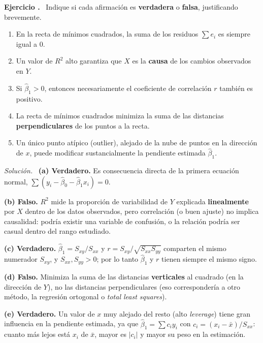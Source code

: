 \documentclass[11pt,a4paper]{article}
\newcounter{ejnum}
\newenvironment{ejercicio}{\refstepcounter{ejnum}\par\medskip\noindent\textbf{Ejercicio \theejnum.}~}{\par}
\newenvironment{solucion}{\par\noindent\textit{Solución.}~}{\par\vspace{1em}}
\begin{document}
\begin{ejercicio}
Indique si cada afirmación es \textbf{verdadera} o \textbf{falsa}, justificando brevemente.
\begin{enumerate}[label=(\alph*)]
\item En la recta de mínimos cuadrados, la suma de los residuos $\sum e_i$ es siempre igual a $0$.
\item Un valor de $R^2$ alto garantiza que $X$ es la \textbf{causa} de los cambios observados en $Y$.
\item Si $\hat\beta_1>0$, entonces necesariamente el coeficiente de correlación $r$ también es positivo.
\item La recta de mínimos cuadrados minimiza la suma de las distancias \textbf{perpendiculares} de los puntos a la recta.
\item Un único punto atípico (outlier), alejado de la nube de puntos en la dirección de $x$, puede modificar sustancialmente la pendiente estimada $\hat\beta_1$.
\end{enumerate}
\end{ejercicio}

\begin{solucion}
\textbf{(a) Verdadero.} Es consecuencia directa de la primera ecuación normal, $\sum(y_i-\hat\beta_0-\hat\beta_1x_i)=0$.

\textbf{(b) Falso.} $R^2$ mide la proporción de variabilidad de $Y$ explicada \textbf{linealmente} por $X$ dentro de los datos observados, pero correlación (o buen ajuste) no implica causalidad: podría existir una variable de confusión, o la relación podría ser casual dentro del rango estudiado.

\textbf{(c) Verdadero.} $\hat\beta_1=S_{xy}/S_{xx}$ y $r=S_{xy}/\sqrt{S_{xx}S_{yy}}$ comparten el mismo numerador $S_{xy}$, y $S_{xx},S_{yy}>0$; por lo tanto $\hat\beta_1$ y $r$ tienen siempre el mismo signo.

\textbf{(d) Falso.} Minimiza la suma de las distancias \textbf{verticales} al cuadrado (en la dirección de $Y$), no las distancias perpendiculares (eso correspondería a otro método, la regresión ortogonal o \emph{total least squares}).

\textbf{(e) Verdadero.} Un valor de $x$ muy alejado del resto (alto \emph{leverage}) tiene gran influencia en la pendiente estimada, ya que $\hat\beta_1=\sum c_i y_i$ con $c_i=(x_i-\bar x)/S_{xx}$: cuanto más lejos está $x_i$ de $\bar x$, mayor es $|c_i|$ y mayor su peso en la estimación.
\end{solucion}
\end{document}
